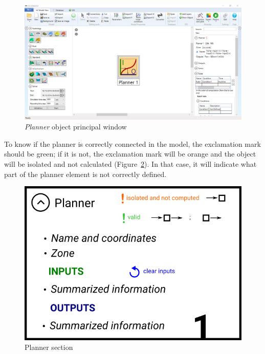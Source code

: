 \documentclass[
  letterpaper,
  DIV=11,
  numbers=noendperiod]{scrreprt}
\begin{document}
\begin{figure}

{\centering \includegraphics{./figures/fig-planner_principal_window.png}

}

\caption{\label{fig-planner_principal_window}\emph{Planner} object
principal window}

\end{figure}

To know if the planner is correctly connected in the model, the
exclamation mark should be green; if it is not, the exclamation mark
will be orange and the object will be isolated and not calculated
(Figure~\ref{fig-planner_section}). In that case, it will indicate what
part of the planner element is not correctly defined.

\begin{figure}

{\centering \includegraphics{./figures/fig-planner_section.png}

}

\caption{\label{fig-planner_section}Planner section}

\end{figure}
\end{document}
